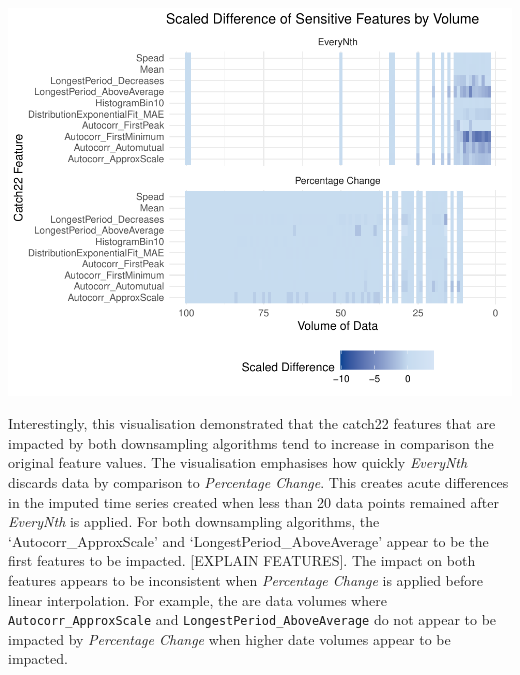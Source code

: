 \documentclass{article}
\begin{document}
\includegraphics{210431461_CSC8639_Dissertation_files/figure-latex/Heatmap-1.pdf}

Interestingly, this visualisation demonstrated that the catch22 features
that are impacted by both downsampling algorithms tend to increase in
comparison the original feature values. The visualisation emphasises how
quickly \emph{EveryNth} discards data by comparison to \emph{Percentage
Change}. This creates acute differences in the imputed time series
created when less than 20 data points remained after \emph{EveryNth} is
applied. For both downsampling algorithms, the `Autocorr\_ApproxScale'
and `LongestPeriod\_AboveAverage' appear to be the first features to be
impacted. {[}EXPLAIN FEATURES{]}. The impact on both features appears to
be inconsistent when \emph{Percentage Change} is applied before linear
interpolation. For example, the are data volumes where
\texttt{Autocorr\_ApproxScale} and \texttt{LongestPeriod\_AboveAverage}
do not appear to be impacted by \emph{Percentage Change} when higher
date volumes appear to be impacted.
\end{document}
